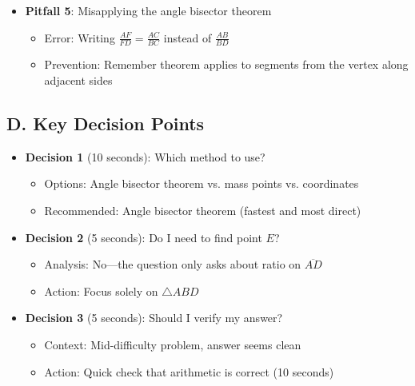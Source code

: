 \documentclass[12pt]{article}
\begin{document}
\begin{roadmapbox}
\begin{itemize}[leftmargin=*]
    \item \textbf{Pitfall 5}: Misapplying the angle bisector theorem
    \begin{itemize}
        \item Error: Writing $\frac{AF}{FD} = \frac{AC}{BC}$ instead of $\frac{AB}{BD}$
        \item Prevention: Remember theorem applies to segments from the vertex along adjacent sides
    \end{itemize}
\end{itemize}

\subsection*{D. Key Decision Points}
\begin{itemize}[leftmargin=*]
    \item \textbf{Decision 1} (10 seconds): Which method to use?
    \begin{itemize}
        \item Options: Angle bisector theorem vs. mass points vs. coordinates
        \item Recommended: Angle bisector theorem (fastest and most direct)
    \end{itemize}
    
    \item \textbf{Decision 2} (5 seconds): Do I need to find point $E$?
    \begin{itemize}
        \item Analysis: No—the question only asks about ratio on $\overline{AD}$
        \item Action: Focus solely on $\triangle ABD$
    \end{itemize}
    
    \item \textbf{Decision 3} (5 seconds): Should I verify my answer?
    \begin{itemize}
        \item Context: Mid-difficulty problem, answer seems clean
        \item Action: Quick check that arithmetic is correct (10 seconds)
    \end{itemize}
\end{itemize}
\end{roadmapbox}
\end{document}
